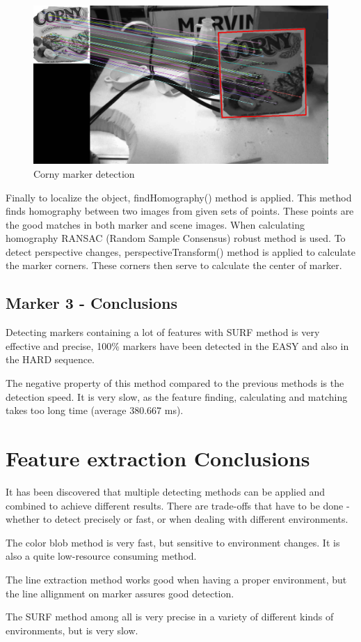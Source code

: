 \begin{figure}[ht!]
	\centering
	\includegraphics[width=\textwidth]{figures/corny1}
	\caption{Corny marker detection}
	\label{fig:corny1}
\end{figure}
\newpage
Finally to localize the object, findHomography() method is applied. This method finds homography between two images from given sets of points. These points are the good matches in both marker and scene images. When calculating homography RANSAC (Random Sample Consensus) robust method is used. To detect perspective changes, perspectiveTransform() method is applied to calculate the marker corners. These corners then serve to calculate the center of marker. 



\subsection{Marker 3 - Conclusions}
Detecting markers containing a lot of features with SURF method is very effective and precise, 100\% markers have been detected in the EASY and also in the HARD sequence. 

The negative property of this method compared to the previous methods is the detection speed. It is very slow, as the feature finding, calculating and matching takes too long time (average 380.667 ms).

\section{Feature extraction Conclusions}
It has been discovered that multiple detecting methods can be applied and combined to achieve different results. There are trade-offs that have to be done - whether to detect precisely or fast, or when dealing with different environments. 

The color blob method is very fast, but sensitive to environment changes. It is also a quite low-resource consuming method.

The line extraction method works good when having a proper environment, but the line allignment on marker assures good detection. 

The SURF method among all is very precise in a variety of different kinds of environments, but is very slow. 